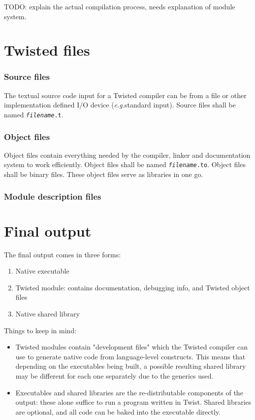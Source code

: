 \documentclass[a4paper,11pt]{report}
\newcommand{\tcode}[1]{\texttt{#1}}
\newcommand{\eg}{\textit{e.g.}}
\begin{document}
TODO: explain the actual compilation process, needs explanation of module system.

\section{Twisted files}

\subsubsection{Source files} \label{sec:source_files}

The textual source code input for a Twisted compiler can be from a file or other implementation defined I/O device (\eg standard input).
Source files shall be named \tcode{\textit{filename}.t}.

\subsubsection{Object files} \label{sec:object_files}

Object files contain everything needed by the compiler, linker and documentation system to work efficiently.
Object files shall be named \tcode{\textit{filename}.to}.
Object files shall be binary files.
These object files serve as libraries in one go.

\subsubsection{Module description files} \label{sec:module_description_files}


\section{Final output}

The final output comes in three forms:
\begin{enumerate}
 \item Native executable
 \item Twisted module: contains documentation, debugging info, and Twisted object files
 \item Native shared library
\end{enumerate}
Things to keep in mind:
\begin{itemize}
 \item Twisted modules contain "development files" which the Twisted compiler can use to generate native code from language-level constructs. This means that depending on the executables being built, a possible resulting shared library may be different for each one separately due to the generics used.
 \item Executables and shared libraries are the re-distributable components of the output: these alone suffice to run a program written in Twist. Shared libraries are optional, and all code can be baked into the executable directly.
\end{itemize}
\end{document}
